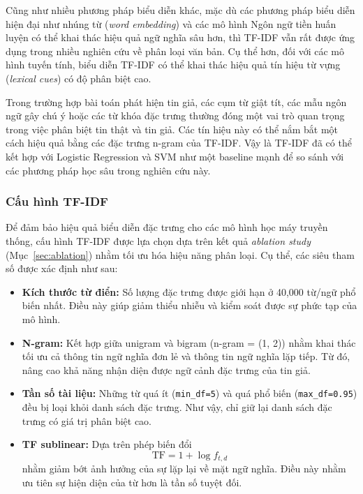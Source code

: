\documentclass[12pt, a4paper]{report}
\newcommand{\tfidfMaxFeatures}{40,000}
\begin{document}
Cũng như nhiều phương pháp biểu diễn khác, mặc dù các phương pháp biểu diễn hiện đại như nhúng từ (\textit{word embedding}) và các mô hình Ngôn ngữ tiền huấn luyện có thể khai thác hiệu quả ngữ nghĩa sâu hơn, thì TF-IDF vẫn rất được ứng dụng trong nhiều nghiên cứu về phân loại văn bản. Cụ thể hơn, đối với các mô hình tuyến tính, biểu diễn TF-IDF có thể khai thác hiệu quả tín hiệu từ vựng (\textit{lexical cues}) có độ phân biệt cao.

Trong trường hợp bài toán phát hiện tin giả, các cụm từ giật tít, các mẫu ngôn ngữ gây chú ý hoặc các từ khóa đặc trưng thường đóng một vai trò quan trọng trong việc phân biệt tin thật và tin giả. Các tín hiệu này có thể nắm bắt một cách hiệu quả bằng các đặc trưng n-gram của TF-IDF. Vậy là TF-IDF đã có thể kết hợp với Logistic Regression và SVM như một baseline mạnh để so sánh với các phương pháp học sâu trong nghiên cứu này.

\subsubsection{Cấu hình TF-IDF}

Để đảm bảo hiệu quả biểu diễn đặc trưng cho các mô hình học máy truyền
thống, cấu hình TF-IDF được lựa chọn dựa trên kết quả \textit{ablation
study} (Mục~\ref{sec:ablation}) nhằm tối ưu hóa hiệu năng phân loại.
Cụ thể, các siêu tham số được xác định như sau:

\begin{itemize}[leftmargin=2em]

  \item \textbf{Kích thước từ điển:}
  Số lượng đặc trưng được giới hạn ở \tfidfMaxFeatures{} từ/ngữ phổ
  biến nhất. Điều này giúp giảm thiểu nhiễu và kiểm soát được sự phức tạp
  của mô hình.

  \item \textbf{N-gram:}
  Kết hợp giữa unigram và bigram (n-gram = (1, 2)) nhằm khai thác tối
  ưu cả thông tin ngữ nghĩa đơn lẻ và thông tin ngữ nghĩa lặp tiếp. Từ đó,
  nâng cao khả năng nhận diện được ngữ cảnh đặc trưng của tin giả.

  \item \textbf{Tần số tài liệu:}
  Những từ quá ít (\texttt{min\_df=5}) và quá phổ biến (\texttt{max\_df=0.95})
  đều bị loại khỏi danh sách đặc trưng. Như vậy, chỉ giữ lại danh sách đặc
  trưng có giá trị phân biệt cao.

  \item \textbf{TF sublinear:}
  Dựa trên phép biến đổi \[\text{TF} = 1 + \log f_{t,d}\] nhằm giảm bớt
  ảnh hưởng của sự lặp lại về mặt ngữ nghĩa. Điều này nhằm ưu tiên sự hiện
  diện của từ hơn là tần số tuyệt đối.

\end{itemize}
\end{document}
